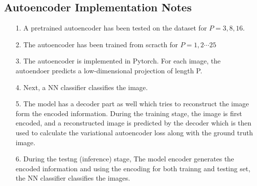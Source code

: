 \documentclass{article}
\begin{document}
\subsection*{Autoencoder Implementation Notes}
\begin{itemize}
\item[1.] A pretrained autoencoder has been tested on the dataset for $P=3,8,16$.
\item[2.] The autoencoder has been trained from scracth for $P=1,2\cdots 25$
\item[3.] The autoencoder is implemented in Pytorch. For each image, the autoendoer predicts a low-dimensional projection of length P.
\item[4.] Next, a NN classifier classifies the image.
\item[5.] The model has a decoder part as well which tries to reconstruct the image form the encoded information. During the training stage, the image is first encoded, and a reconstructed image is predicted by the decoder which is then used to calculate the variational autoencoder loss along with the ground truth image.
\item[6.] During the testng (inference) stage, The model encoder generates the encoded information and using the encoding for both trainng and testing set, the NN classifier classifies the images.
\end{itemize}
\end{document}
